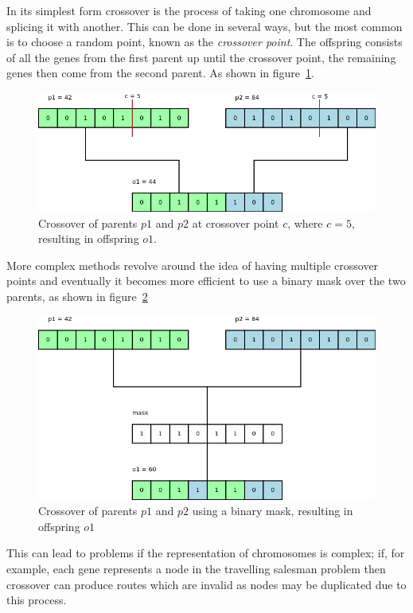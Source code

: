 \documentclass[10pt, a4paper]{article}
\begin{document}
In its simplest form crossover is the process of taking one chromosome and
splicing it with another. This can be done in several ways, but the most common
is to choose a random point, known as the \textit{crossover point}. The
offspring consists of all the genes from the first parent up until the 
crossover point, the remaining genes then come from the second parent. As shown
in figure~\ref{fig:crossover-point}.

\begin{figure}[h]
\centering
\includegraphics[scale=0.45]{img/crossover.png}
\caption{Crossover of parents $p1$ and $p2$ at crossover point $c$, where 
         $c=5$, resulting in offspring $o1$.} 
\label{fig:crossover-point}
\end{figure}

More complex methods revolve around the idea of having multiple crossover 
points and eventually it becomes more efficient to use a binary mask over
the two parents, as shown in figure~\ref{fig:crossover-mask}

\begin{figure}[h]
\includegraphics[scale=0.45]{img/mask-crossover.png}
\caption{Crossover of parents $p1$ and $p2$ using a binary mask, resulting in
         offspring $o1$}
\label{fig:crossover-mask}
\end{figure}

This can lead to problems if the representation of chromosomes is complex; if,
for example, each gene represents a node in the travelling salesman problem
then crossover can produce routes which are invalid as nodes may be duplicated
due to this process.
\end{document}
